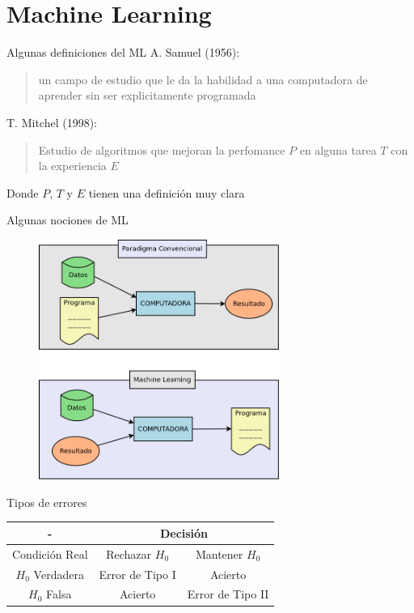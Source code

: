 \documentclass[14pt]{beamer}
\begin{document}
\section{Machine Learning}

\begin{frame}{Algunas definiciones del ML}
    A. Samuel (1956):
    \begin{quote}
        un campo de estudio que le da la habilidad a una computadora de aprender sin ser explicitamente programada
    \end{quote}
    T. Mitchel (1998):
    \begin{quote}
        Estudio de algoritmos que mejoran la perfomance $P$ en alguna tarea $T$ con la experiencia $E$
    \end{quote}
    Donde $P$, $T$ y $E$ tienen una definici\'on muy clara
\end{frame}

\begin{frame}{Algunas nociones de ML}
    \begin{figure}
        \centering
        \includegraphics[width=0.7\textwidth]{images/ML_vs_programming.png}
        \label{fig:ML_vs_conventional}
    \end{figure}
\end{frame}

\begin{frame}{Tipos de errores}
\small
\begin{center}
\begin{tabular}{|c|c|l|}
\hline
- & \multicolumn{2}{c|}{Decisi\'on}\\
\hline \hline
Condici\'on Real & Rechazar $H_0$ & \multicolumn{1}{c|}{Mantener $H_0$}\\
\hline
$H_0$ Verdadera & Error de Tipo I & \multicolumn{1}{c|}{Acierto}\\
\hline
$H_0$ Falsa & Acierto & \multicolumn{1}{c|}{Error de Tipo II}\\
\hline
\end{tabular}
\end{center}
\end{frame}
\end{document}
